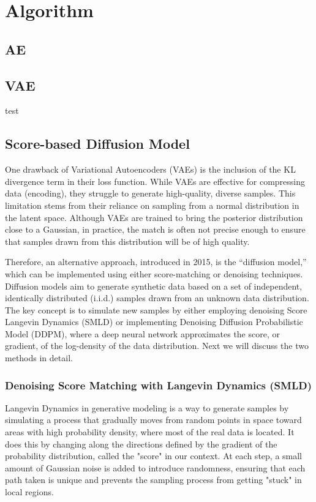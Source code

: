 \chapter{Algorithm}
\section{AE}
\section{VAE}
test
\section{Score-based Diffusion Model}
One drawback of Variational Autoencoders (VAEs) is the inclusion of the KL divergence term in their loss function. While VAEs are effective for compressing data (encoding), they struggle to generate high-quality, diverse samples. This limitation stems from their reliance on sampling from a normal distribution in the latent space. Although VAEs are trained to bring the posterior distribution close to a Gaussian, in practice, the match is often not precise enough to ensure that samples drawn from this distribution will be of high quality.

Therefore, an alternative approach, introduced in 2015, is the “diffusion model,” which can be implemented using either score-matching or denoising techniques. Diffusion models aim to generate synthetic data based on a set of independent, identically distributed (i.i.d.) samples drawn from an unknown data distribution. The key concept is to simulate new samples by either employing denoising Score Langevin Dynamics (SMLD) or implementing Denoising Diffusion Probabilistic Model (DDPM), where a deep neural network approximates the score, or gradient, of the log-density of the data distribution. Next we will discuss the two methods in detail.

\subsection{Denoising Score Matching with Langevin Dynamics (SMLD)}
Langevin Dynamics in generative modeling is a way to generate samples by simulating a process that gradually moves from random points in space toward areas with high probability density, where most of the real data is located. It does this by changing along the directions defined by the gradient of the probability distribution, called the "score" in our context. At each step, a small amount of Gaussian noise is added to introduce randomness, ensuring that each path taken is unique and prevents the sampling process from getting "stuck" in local regions.


